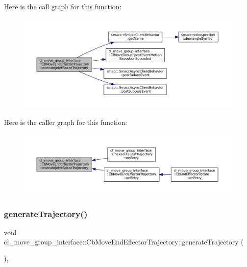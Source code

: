 Here is the call graph for this function\+:
\nopagebreak
\begin{figure}[H]
\begin{center}
\leavevmode
\includegraphics[width=350pt]{classcl__move__group__interface_1_1CbMoveEndEffectorTrajectory_a3a75fa185c62591e1869427650338a32_cgraph}
\end{center}
\end{figure}
Here is the caller graph for this function\+:
\nopagebreak
\begin{figure}[H]
\begin{center}
\leavevmode
\includegraphics[width=350pt]{classcl__move__group__interface_1_1CbMoveEndEffectorTrajectory_a3a75fa185c62591e1869427650338a32_icgraph}
\end{center}
\end{figure}
\mbox{\label{classcl__move__group__interface_1_1CbMoveEndEffectorTrajectory_aeae938ab66e18ab7d2fb2427bc83647b}} 
\subsubsection{\texorpdfstring{generate\+Trajectory()}{generateTrajectory()}}
{\footnotesize\ttfamily void cl\+\_\+move\+\_\+group\+\_\+interface\+::\+Cb\+Move\+End\+Effector\+Trajectory\+::generate\+Trajectory (\begin{DoxyParamCaption}{ }\end{DoxyParamCaption})\hspace{0.3cm}{\ttfamily [protected]}, {\ttfamily [virtual]}}




